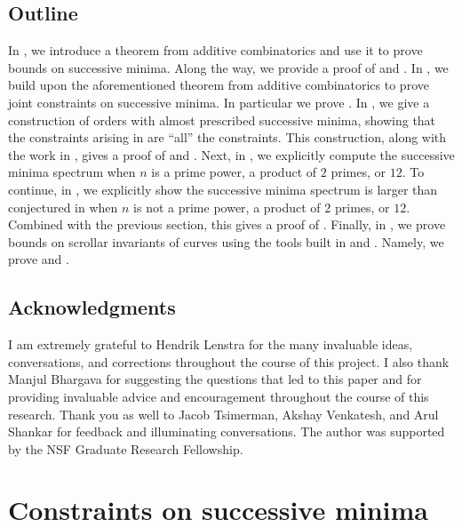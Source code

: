 \documentclass[letterpaper,10pt]{amsart}
\theoremstyle{definition}
\theoremstyle{remark}
\begin{document}
\subsection{Outline}
In , we introduce a theorem from additive combinatorics and use it to prove bounds on successive minima. Along the way, we provide a proof of  and . In , we build upon the aforementioned theorem from additive combinatorics to prove joint constraints on successive minima. In particular we prove . In , we give a construction of orders with almost prescribed successive minima, showing that the constraints arising in  are ``all'' the constraints. This construction, along with the work in , gives a proof of  and . Next, in , we explicitly compute the successive minima spectrum when $n$ is a prime power, a product of $2$ primes, or $12$. To continue, in , we explicitly show the successive minima spectrum is larger than conjectured in  when $n$ is not a prime power, a product of $2$ primes, or $12$. Combined with the previous section, this gives a proof of . Finally, in , we prove bounds on scrollar invariants of curves using the tools built in  and . Namely, we prove  and .

\subsection{Acknowledgments}
I am extremely grateful to Hendrik Lenstra for the many invaluable ideas, conversations, and corrections throughout the course of this project. I also thank Manjul Bhargava for suggesting the questions that led to this paper and for providing invaluable advice and encouragement throughout the course of this research. Thank you as well to Jacob Tsimerman, Akshay Venkatesh, and Arul Shankar for feedback and illuminating conversations. The author was supported by the NSF Graduate Research Fellowship. 

\section{Constraints on successive minima}
\label{sec:constraints}
\end{document}
